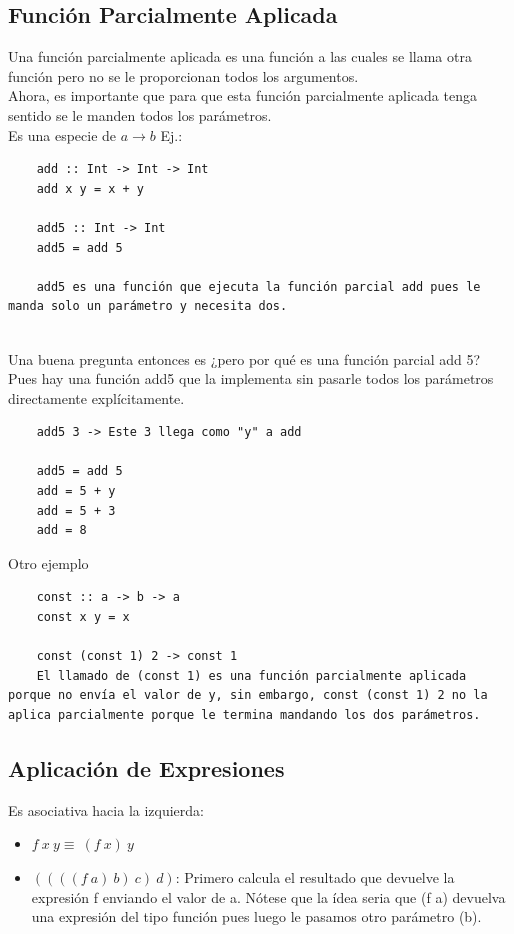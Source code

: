 \documentclass[10pt,a4paper]{article}
\begin{document}
\subsection*{Función Parcialmente Aplicada}
Una función parcialmente aplicada es una función a las cuales se llama otra función pero no se le proporcionan todos los argumentos. \\
Ahora, es importante que para que esta función parcialmente aplicada tenga sentido se le manden todos los parámetros. \\
Es una especie de $ a \rightarrow b$
Ej.: 
\begin{lstlisting}
    add :: Int -> Int -> Int
    add x y = x + y

    add5 :: Int -> Int
    add5 = add 5

    add5 es una función que ejecuta la función parcial add pues le manda solo un parámetro y necesita dos.
   
\end{lstlisting}
Una buena pregunta entonces es ¿pero por qué es una función parcial add 5? Pues hay una función add5 que la implementa sin pasarle todos los parámetros directamente explícitamente.
\begin{lstlisting}
    add5 3 -> Este 3 llega como "y" a add

    add5 = add 5 
    add = 5 + y
    add = 5 + 3
    add = 8 

\end{lstlisting}

Otro ejemplo 
\begin{lstlisting}
    const :: a -> b -> a 
    const x y = x

    const (const 1) 2 -> const 1
    El llamado de (const 1) es una función parcialmente aplicada porque no envía el valor de y, sin embargo, const (const 1) 2 no la aplica parcialmente porque le termina mandando los dos parámetros.
\end{lstlisting}

\subsection*{Aplicación de Expresiones}
Es asociativa hacia la izquierda:
\begin{itemize}
    \item $ f \ x \ y \equiv \ (f \ x) \ y $
    \item $ ((((f \ a) \ b) \ c) \ d)$: Primero calcula el resultado que devuelve la expresión f enviando el valor de a. Nótese que la ídea seria que (f a) devuelva una expresión del tipo función pues luego le pasamos otro parámetro (b).
\end{itemize}
\end{document}
